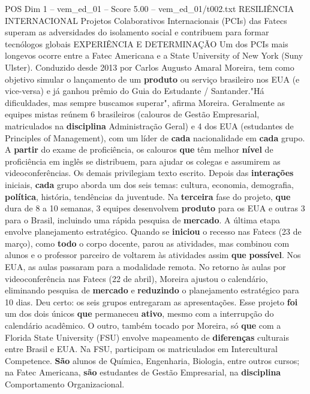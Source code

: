 \begin{textsample}{POS Dim 1 – vem\_ed\_01 – Score 5.00 – vem\_ed\_01/t002.txt}  \label{ex:f1_pos_096}
RESILIÊNCIA INTERNACIONAL Projetos Colaborativos Internacionais (PCIs) das Fatecs superam as adversidades do isolamento social e contribuem para formar tecnólogos globais EXPERIÊNCIA E DETERMINAÇÃO Um dos PCIs mais longevos ocorre entre a Fatec Americana e a State University of New York (Suny Ulster).
Conduzido desde 2013 por Carlos Augusto Amaral Moreira, tem como objetivo simular o lançamento de um \textbf{produto} ou serviço brasileiro nos EUA (e vice-versa) e já ganhou prêmio do Guia do Estudante / Santander."Há dificuldades, mas sempre buscamos superar", afirma Moreira.
Geralmente as equipes mistas reúnem 6 brasileiros (calouros de Gestão Empresarial, matriculados na \textbf{disciplina} Administração Geral) e 4 dos EUA (estudantes de Principles of Management), com um líder de \textbf{cada} nacionalidade em \textbf{cada} grupo.
A \textbf{partir} do exame de proficiência, os calouros \textbf{que} têm melhor \textbf{nível} de proficiência em inglês se distribuem, para ajudar os colegas e assumirem as videoconferências.
Os demais privilegiam texto escrito.
Depois das \textbf{interações} iniciais, \textbf{cada} grupo aborda um dos seis temas: cultura, economia, demografia, \textbf{política}, história, tendências da juventude.
Na \textbf{terceira} fase do projeto, \textbf{que} dura de 8 a 10 semanas, 3 equipes desenvolvem \textbf{produto} para os EUA e outras 3 para o Brasil, incluindo uma rápida pesquisa de \textbf{mercado}.
A última etapa envolve planejamento estratégico.
Quando se \textbf{iniciou} o recesso nas Fatecs (23 de março), como \textbf{todo} o corpo docente, parou as atividades, mas combinou com alunos e o professor parceiro de voltarem às atividades assim \textbf{que} \textbf{possível}.
Nos EUA, as aulas passaram para a modalidade remota.
No retorno às aulas por videoconferência nas Fatecs (22 de abril), Moreira ajustou o calendário, eliminando pesquisa de \textbf{mercado} e \textbf{reduzindo} o planejamento estratégico para 10 dias.
Deu certo: os seis grupos entregaram as apresentações.
Esse projeto \textbf{foi} um dos dois únicos \textbf{que} permaneceu \textbf{ativo}, mesmo com a interrupção do calendário acadêmico.
O outro, também tocado por Moreira, só \textbf{que} com a Florida State University (FSU) envolve mapeamento de \textbf{diferenças} culturais entre Brasil e EUA.
Na FSU, participam os matriculados em Intercultural Competence. \textbf{São} alunos de Química, Engenharia, Biologia, entre outros cursos; na Fatec Americana, \textbf{são} estudantes de Gestão Empresarial, na \textbf{disciplina} Comportamento Organizacional.

\end{textsample}
